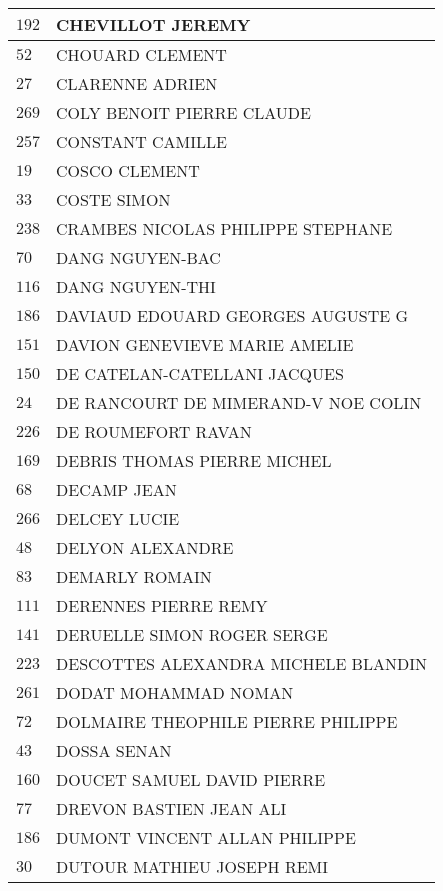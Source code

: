 \begin{xltabular}{\linewidth}{|l|X|}
    \hline
    $192$ & CHEVILLOT JEREMY \\
    \hline
    $52$ & CHOUARD CLEMENT \\
    \hline
    $27$ & CLARENNE ADRIEN \\
    \hline
    $269$ & COLY BENOIT PIERRE CLAUDE \\
    \hline
    $257$ & CONSTANT CAMILLE \\
    \hline
    $19$ & COSCO CLEMENT \\
    \hline
    $33$ & COSTE SIMON \\
    \hline
    $238$ & CRAMBES NICOLAS PHILIPPE STEPHANE \\
    \hline
    $70$ & DANG NGUYEN-BAC \\
    \hline
    $116$ & DANG NGUYEN-THI \\
    \hline
    $186$ & DAVIAUD EDOUARD GEORGES AUGUSTE G \\
    \hline
    $151$ & DAVION GENEVIEVE MARIE AMELIE \\
    \hline
    $150$ & DE CATELAN-CATELLANI JACQUES \\
    \hline
    $24$ & DE RANCOURT DE MIMERAND-V NOE COLIN \\
    \hline
    $226$ & DE ROUMEFORT RAVAN \\
    \hline
    $169$ & DEBRIS THOMAS PIERRE MICHEL \\
    \hline
    $68$ & DECAMP JEAN \\
    \hline
    $266$ & DELCEY LUCIE \\
    \hline
    $48$ & DELYON ALEXANDRE \\
    \hline
    $83$ & DEMARLY ROMAIN \\
    \hline
    $111$ & DERENNES PIERRE REMY \\
    \hline
    $141$ & DERUELLE SIMON ROGER SERGE \\
    \hline
    $223$ & DESCOTTES ALEXANDRA MICHELE BLANDIN \\
    \hline
    $261$ & DODAT MOHAMMAD NOMAN \\
    \hline
    $72$ & DOLMAIRE THEOPHILE PIERRE PHILIPPE \\
    \hline
    $43$ & DOSSA SENAN \\
    \hline
    $160$ & DOUCET SAMUEL DAVID PIERRE \\
    \hline
    $77$ & DREVON BASTIEN JEAN ALI \\
    \hline
    $186$ & DUMONT VINCENT ALLAN PHILIPPE \\
    \hline
    $30$ & DUTOUR MATHIEU JOSEPH REMI \\

\end{xltabular}
